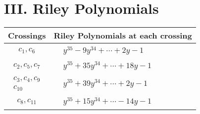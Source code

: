 \documentclass[1p]{elsarticle_modified}
\theoremstyle{definition}
\begin{document}
\centering \section*{ III. Riley Polynomials}
\begin{tabular}{m{50pt}|m{274pt}}
Crossings & \hspace{64pt}Riley Polynomials at each crossing \\
\hline $$\begin{aligned}c_{1},c_{6}\end{aligned}$$&$\begin{aligned}
&y^{35}-9 y^{34}+\cdots+2 y-1
\end{aligned}$\\
\hline $$\begin{aligned}c_{2},c_{5},c_{7}\end{aligned}$$&$\begin{aligned}
&y^{35}+35 y^{34}+\cdots+18 y-1
\end{aligned}$\\
\hline $$\begin{aligned}c_{3},c_{4},c_{9}\\c_{10}\end{aligned}$$&$\begin{aligned}
&y^{35}+39 y^{34}+\cdots+2 y-1
\end{aligned}$\\
\hline $$\begin{aligned}c_{8},c_{11}\end{aligned}$$&$\begin{aligned}
&y^{35}+15 y^{34}+\cdots-14 y-1
\end{aligned}$\\
\hline
\end{tabular}
\vskip 2pc
\end{document}

